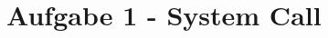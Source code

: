 \documentclass[12pt]{article}
\date{}
\begin{document}
	
\section*{Aufgabe 1 - System Call}

	
\end{document}
